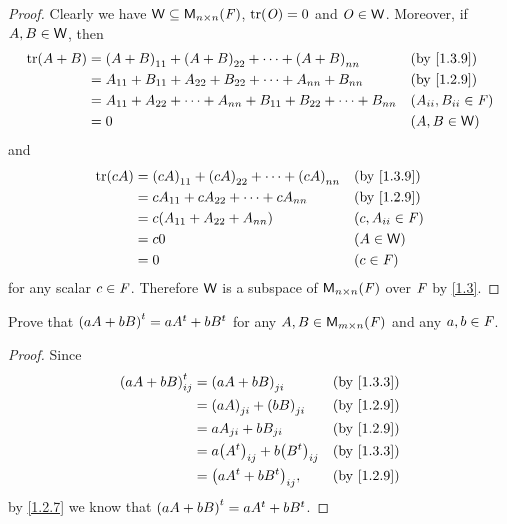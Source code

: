 \begin{proof}
  Clearly we have \(\mathsf{W} \subseteq \mathsf{M}_{{n} \times n}({\mathit{F}})\), \(\tr{\zm} = 0\) and \(\mathit{O} \in \mathsf{W}\).
  Moreover, if \(A, B \in \mathsf{W}\), then
  \begin{align*}
    \tr{A + B} & = \p{A + B}_{1 1} + \p{A + B}_{2 2} + \dots + \p{A + B}_{n n}               &  & \text{(by \cref{1.3.9})}  \\
               & = A_{1 1} + B_{1 1} + A_{2 2} + B_{2 2} + \dots + A_{n n} + B_{n n}         &  & \text{(by \cref{1.2.9})}  \\
               & = A_{1 1} + A_{2 2} + \dots + A_{n n} + B_{1 1} + B_{2 2} + \dots + B_{n n} &  & (A_{i i}, B_{i i} \in \F) \\
               & = 0                                                                         &  & (A, B \in \W)
  \end{align*}
  and
  \begin{align*}
    \tr{cA} & = \p{cA}_{1 1} + \p{cA}_{2 2} + \dots + \p{cA}_{n n} &  & \text{(by \cref{1.3.9})} \\
            & = cA_{1 1} + cA_{2 2} + \dots + cA_{n n}             &  & \text{(by \cref{1.2.9})} \\
            & = c\p{A_{1 1} + A_{2 2} + A_{n n}}                   &  & (c, A_{i i} \in \F)      \\
            & = c0                                                 &  & (A \in \W)               \\
            & = 0                                                  &  & (c \in \F)
  \end{align*}
  for any scalar \(c \in \mathit{F}\).
  Therefore \(\mathsf{W}\) is a subspace of \(\mathsf{M}_{{n} \times n}({\mathit{F}})\) over \(\mathit{F}\) by \cref{1.3}.
\end{proof}

\exercisesection

\setcounter{ex}{2}
\begin{ex}\label{ex:1.3.3}
  Prove that \({\left\lparen aA + bB\right\rparen}^{t} = a{A}^{t} + b{B}^{t}\) for any \(A, B \in \mathsf{M}_{{m} \times n}({\mathit{F}})\) and any \(a, b \in \mathit{F}\).
\end{ex}

\begin{proof}
  Since
  \begin{align*}
    \tp{\p{aA + bB}}_{i j} & = \p{aA + bB}_{j i}                     &  & \text{(by \cref{1.3.3})} \\
                           & = \p{aA}_{j i} + \p{bB}_{j i}           &  & \text{(by \cref{1.2.9})} \\
                           & = aA_{j i} + bB_{j i}                   &  & \text{(by \cref{1.2.9})} \\
                           & = a\p{\tp{A}}_{i j} + b\p{\tp{B}}_{i j} &  & \text{(by \cref{1.3.3})} \\
                           & = \p{a\tp{A} + b\tp{B}}_{i j},          &  & \text{(by \cref{1.2.9})}
  \end{align*}
  by \cref{1.2.7} we know that \({\left\lparen aA + bB\right\rparen}^{t} = a{A}^{t} + b{B}^{t}\).
\end{proof}